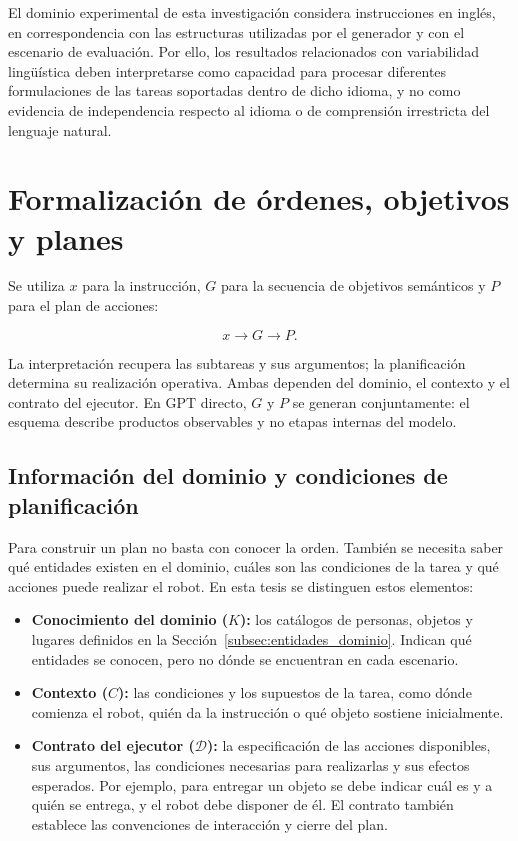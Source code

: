 El dominio experimental de esta investigación considera
instrucciones en inglés, en correspondencia con las estructuras utilizadas por
el generador y con el escenario de evaluación. Por ello, los resultados
relacionados con variabilidad lingüística deben interpretarse como capacidad
para procesar diferentes formulaciones de las tareas soportadas dentro de dicho
idioma, y no como evidencia de independencia respecto al idioma o de
comprensión irrestricta del lenguaje natural.


\section{Formalización de órdenes, objetivos y planes}
\label{sec:formalizacion_ordenes}

Se utiliza $x$ para la instrucción, $G$ para la secuencia de objetivos semánticos y $P$ para el plan de acciones:

\begin{equation}
x \longrightarrow G \longrightarrow P.
\label{eq:orden_goals_plan}
\end{equation}

La interpretación recupera las subtareas y sus argumentos; la planificación determina su realización operativa. Ambas dependen del dominio, el contexto y el contrato del ejecutor. En GPT directo, $G$ y $P$ se generan conjuntamente: el esquema describe productos observables y no etapas internas del modelo.

\subsection{Información del dominio y condiciones de planificación}
\label{subsec:contexto_contrato_estado}

Para construir un plan no basta con conocer la orden. También se necesita saber qué entidades existen en el dominio, cuáles son las condiciones de la tarea y qué acciones puede realizar el robot. En esta tesis se distinguen estos elementos:

\begin{itemize}
    \item \textbf{Conocimiento del dominio ($K$):} los catálogos de personas, objetos y lugares definidos en la Sección~\ref{subsec:entidades_dominio}. Indican qué entidades se conocen, pero no dónde se encuentran en cada escenario.
    \item \textbf{Contexto ($C$):} las condiciones y los supuestos de la tarea, como dónde comienza el robot, quién da la instrucción o qué objeto sostiene inicialmente.
    \item \textbf{Contrato del ejecutor ($\mathcal{D}$):} la especificación de las acciones disponibles, sus argumentos, las condiciones necesarias para realizarlas y sus efectos esperados. Por ejemplo, para entregar un objeto se debe indicar cuál es y a quién se entrega, y el robot debe disponer de él. El contrato también establece las convenciones de interacción y cierre del plan.
\end{itemize}

